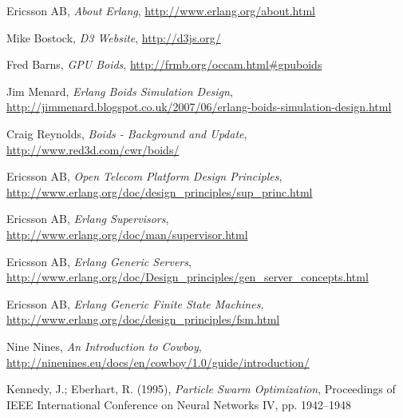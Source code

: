 \documentclass[10pt, a4paper, conference, compsocconf]{IEEEtran}
\begin{document}
%
%
%
\begin{thebibliography}{1}

    Ericsson AB,
    \emph{About Erlang},
    \url{http://www.erlang.org/about.html}

    Mike Bostock,
    \emph{D3 Website},
    \url{http://d3js.org/}

    Fred Barns,
    \emph{GPU Boids},
    \url{http://frmb.org/occam.html#gpuboids}

    Jim Menard,
    \emph{Erlang Boids Simulation Design},
    \url{http://jimmenard.blogspot.co.uk/2007/06/erlang-boids-simulation-design.html}

    Craig Reynolds,
    \emph{Boids - Background and Update},
    \url{http://www.red3d.com/cwr/boids/}

    Ericsson AB,
	  \emph{Open Telecom Platform Design Principles},
    \url{http://www.erlang.org/doc/design_principles/sup_princ.html}

    Ericsson AB,
	  \emph{Erlang Supervisors},
    \url{http://www.erlang.org/doc/man/supervisor.html}

    Ericsson AB,
	  \emph{Erlang Generic Servers},
    \url{http://www.erlang.org/doc/Design_principles/gen_server_concepts.html}

    Ericsson AB,
	  \emph{Erlang Generic Finite State Machines},
    \url{http://www.erlang.org/doc/design_principles/fsm.html}

    Nine Nines,
    \emph{An Introduction to Cowboy},
    \url{http://ninenines.eu/docs/en/cowboy/1.0/guide/introduction/}

    Kennedy, J.; Eberhart, R. (1995),
    \emph{Particle Swarm Optimization},
    Proceedings of IEEE International Conference on Neural Networks IV,
    pp. 1942–1948

\end{thebibliography}

\end{document}
